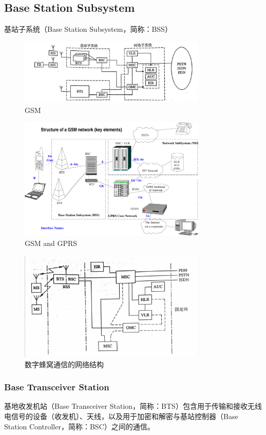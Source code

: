 \documentclass[a4paper]{report}
\begin{document}
\subsection{Base Station Subsystem}
基站子系统（Base Station Subsystem，简称：BSS）

\begin{figure}[H]
\centering
\includegraphics[width=0.8\textwidth]{gsm.jpg}
\caption{GSM}
\end{figure}
\begin{figure}[H]
\centering
\includegraphics[width=0.8\textwidth]{Gsm_network.png}
\caption{GSM and GPRS}
\end{figure}
\begin{figure}[H]
\centering
\includegraphics[width=0.8\textwidth]{cell.jpg}
\caption{数字蜂窝通信的网络结构}
\end{figure}

\subsubsection{Base Transceiver Station}
基地收发机站（Base Transceiver Station，简称：BTS）包含用于传输和接收无线电信号的设备（收发机）、天线，以及用于加密和解密与基站控制器（Base Station Controller，简称：BSC）之间的通信。
\end{document}
